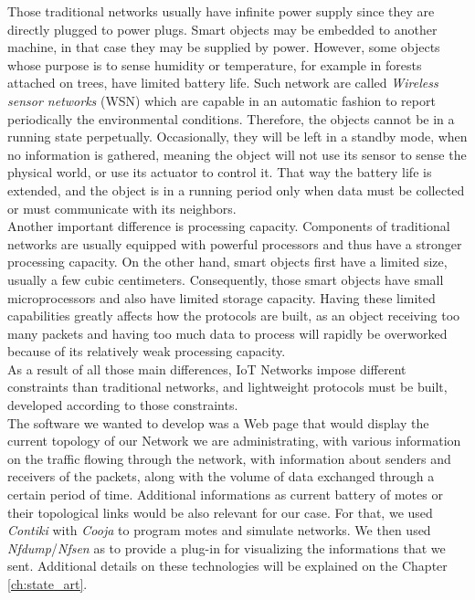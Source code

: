 Those traditional networks usually have infinite power supply since they are directly plugged to power plugs. Smart objects may be embedded to another machine, in that case they may be supplied by power. However, some objects whose purpose is to sense humidity or temperature, for example in forests attached on trees, have limited battery life.  Such network are called \textit{Wireless sensor networks} (WSN) which are capable in an automatic fashion to report periodically the environmental conditions. Therefore, the objects cannot be in a running state perpetually. Occasionally, they will be left in a standby mode, when no information is gathered, meaning the object will not use its sensor to sense the physical world, or use its actuator to control it. That way the battery life is extended, and the object is in a running period only when data must be collected or must communicate with its neighbors. \\

Another important difference is processing capacity. Components of traditional networks are usually equipped with powerful processors and thus have a stronger processing capacity. On the other hand, smart objects first have a limited size, usually a few cubic centimeters. Consequently, those smart objects have small microprocessors and also have limited storage capacity. Having these limited capabilities greatly affects how the protocols are built, as an object receiving too many packets and having too much data to process will rapidly be overworked because of its relatively weak processing capacity. \\

As a result of all those main differences, IoT Networks impose different constraints than traditional networks, and lightweight protocols must be built, developed according to those constraints.\\

The software we wanted to develop was a Web page that would display the current topology of our Network we are administrating, with various information on the traffic flowing through the network, with information about senders and receivers of the packets, along with the volume of data exchanged through a certain period of time. Additional informations as current battery of motes or their topological links would be also relevant for our case. For that, we used \textit{Contiki} with \textit{Cooja} to program motes and simulate networks. We then used \textit{Nfdump}/\textit{Nfsen} as to provide a plug-in for visualizing the informations that we sent. Additional details on these technologies will be explained on the Chapter \ref{ch:state_art}.

